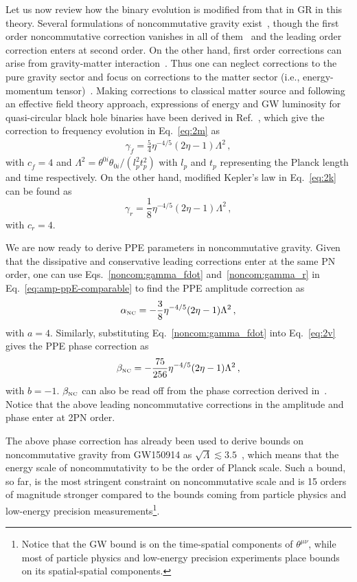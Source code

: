 \documentclass[prd,twocolumn,nofootinbib]{revtex4-1}
\newcommand\be{\begin{equation}}
\newcommand\ba{\begin{eqnarray}}
\newcommand\ee{\end{equation}}
\newcommand\ea{\end{eqnarray}}
\newcommand{\NC}{{\mbox{\tiny NC}}}
\begin{document}
Let us now review how the binary evolution is modified from that in GR in this theory.
Several formulations of noncommutative gravity exist~\cite{Aschieri:2005yw,Aschieri:2005zs,Calmet:2005qm,Chamseddine:2000si,Kobakhidze:2006kb,Szabo:2006wx}, though the first order noncommutative correction vanishes in all of them~\cite{Calmet:2006iz,Mukherjee:2006nd} and the leading order correction enters at second order. On the other hand, first order  corrections can arise from gravity-matter interaction~\cite{Kobakhidze:2007jn,Mukherjee:2006nd}. Thus one can neglect corrections to the pure gravity sector and focus on corrections to the matter sector (i.e., energy-momentum tensor)~\cite{Kobakhidze:2016cqh}. Making corrections to classical matter source and following an effective field theory approach, expressions of energy and GW luminosity for quasi-circular black hole binaries have been derived in Ref.~\cite{Kobakhidze:2016cqh}, which give the correction to frequency evolution in Eq.~\eqref{eq:2m} as
\ba \label{noncom:gamma_fdot}
\gamma_{\dot{f}}=\frac{5}{4}\eta ^{-4/5}(2 \eta -1)\Lambda^2\,,
\ea
with $c_{\dot{f}}=4$ and $\Lambda^2 = \theta^{0i} \theta_{0i}/(l_p^2 t_p^2)$ with $l_p$ and $t_p$ representing the Planck length and time respectively. On the other hand, modified Kepler's law in Eq.~\eqref{eq:2k} can be found as~\cite{Kobakhidze:2016cqh}
\be \label{noncom:gamma_r}
\gamma_r=\frac{1}{8}\eta ^{-4/5}(2 \eta -1)\Lambda^2\,,
\ee
with $c_r=4$. 

We are now ready to derive PPE parameters in noncommutative gravity.
Given that the dissipative and conservative leading corrections enter at the same PN order, one can use Eqs.~\eqref{noncom:gamma_fdot} and~\eqref{noncom:gamma_r} in Eq.~\eqref{eq:amp-ppE-comparable} to find the PPE amplitude correction as
\begin{equation}
 \alpha_{\NC}=-\frac{3}{8}\eta ^{-4/5}(2 \eta -1) \Lambda ^2\,,
 \end{equation}
with $a=4$. Similarly, substituting Eq.~\eqref{noncom:gamma_fdot} into Eq.~\eqref{eq:2v} gives the PPE phase correction as
 \begin{equation}
 \beta_{\NC}=-\frac{75}{256}\eta ^{-4/5}(2 \eta -1) \Lambda ^2\,, 
 \end{equation}
with $b=-1$. $\beta_{\NC}$ can also be read off from the phase correction derived in~\cite{Kobakhidze:2016cqh}.
 Notice that the above leading noncommutative corrections in the amplitude and phase enter at 2PN order. 

The above phase correction has already been used to derive bounds on noncommutative gravity from GW150914 as $\sqrt{\Lambda} \lesssim 3.5$~\cite{Kobakhidze:2016cqh}, which means that the energy scale of noncommutativity to be the order of Planck scale. Such a bound, so far, is the most stringent constraint on noncommutative scale and is 15 orders of magnitude stronger compared to the bounds coming from particle physics and low-energy precision measurements\footnote{Notice that the GW bound is on the time-spatial components of $\theta^{\mu\nu}$, while most of particle physics and low-energy precision experiments place bounds on its spatial-spatial components.}.
 
\end{document}
